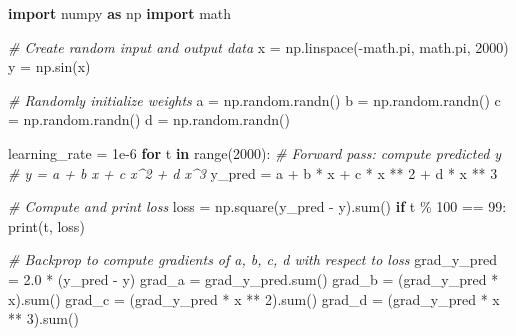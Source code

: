 \documentclass[
]{article}
\newenvironment{Shaded}{}{}
\newcommand{\BuiltInTok}[1]{\textcolor[rgb]{0.00,0.50,0.00}{#1}}
\newcommand{\CommentTok}[1]{\textcolor[rgb]{0.38,0.63,0.69}{\textit{#1}}}
\newcommand{\ControlFlowTok}[1]{\textcolor[rgb]{0.00,0.44,0.13}{\textbf{#1}}}
\newcommand{\DecValTok}[1]{\textcolor[rgb]{0.25,0.63,0.44}{#1}}
\newcommand{\FloatTok}[1]{\textcolor[rgb]{0.25,0.63,0.44}{#1}}
\newcommand{\ImportTok}[1]{\textcolor[rgb]{0.00,0.50,0.00}{\textbf{#1}}}
\newcommand{\KeywordTok}[1]{\textcolor[rgb]{0.00,0.44,0.13}{\textbf{#1}}}
\newcommand{\NormalTok}[1]{#1}
\newcommand{\OperatorTok}[1]{\textcolor[rgb]{0.40,0.40,0.40}{#1}}
\newcommand{\1}{\boldsymbol{1}}
\begin{document}
\begin{Shaded}
\begin{Highlighting}[]
\ImportTok{import}\NormalTok{ numpy }\ImportTok{as}\NormalTok{ np}
\ImportTok{import}\NormalTok{ math}

\CommentTok{\# Create random input and output data}
\NormalTok{x }\OperatorTok{=}\NormalTok{ np.linspace(}\OperatorTok{{-}}\NormalTok{math.pi, math.pi, }\DecValTok{2000}\NormalTok{)}
\NormalTok{y }\OperatorTok{=}\NormalTok{ np.sin(x)}

\CommentTok{\# Randomly initialize weights}
\NormalTok{a }\OperatorTok{=}\NormalTok{ np.random.randn()}
\NormalTok{b }\OperatorTok{=}\NormalTok{ np.random.randn()}
\NormalTok{c }\OperatorTok{=}\NormalTok{ np.random.randn()}
\NormalTok{d }\OperatorTok{=}\NormalTok{ np.random.randn()}

\NormalTok{learning\_rate }\OperatorTok{=} \FloatTok{1e{-}6}
\ControlFlowTok{for}\NormalTok{ t }\KeywordTok{in} \BuiltInTok{range}\NormalTok{(}\DecValTok{2000}\NormalTok{):}
    \CommentTok{\# Forward pass: compute predicted y}
    \CommentTok{\# y = a + b x + c x\^{}2 + d x\^{}3}
\NormalTok{    y\_pred }\OperatorTok{=}\NormalTok{ a }\OperatorTok{+}\NormalTok{ b }\OperatorTok{*}\NormalTok{ x }\OperatorTok{+}\NormalTok{ c }\OperatorTok{*}\NormalTok{ x }\OperatorTok{**} \DecValTok{2} \OperatorTok{+}\NormalTok{ d }\OperatorTok{*}\NormalTok{ x }\OperatorTok{**} \DecValTok{3}

    \CommentTok{\# Compute and print loss}
\NormalTok{    loss }\OperatorTok{=}\NormalTok{ np.square(y\_pred }\OperatorTok{{-}}\NormalTok{ y).}\BuiltInTok{sum}\NormalTok{()}
    \ControlFlowTok{if}\NormalTok{ t }\OperatorTok{\%} \DecValTok{100} \OperatorTok{==} \DecValTok{99}\NormalTok{:}
        \BuiltInTok{print}\NormalTok{(t, loss)}

    \CommentTok{\# Backprop to compute gradients of a, b, c, d with respect to loss}
\NormalTok{    grad\_y\_pred }\OperatorTok{=} \FloatTok{2.0} \OperatorTok{*}\NormalTok{ (y\_pred }\OperatorTok{{-}}\NormalTok{ y)}
\NormalTok{    grad\_a }\OperatorTok{=}\NormalTok{ grad\_y\_pred.}\BuiltInTok{sum}\NormalTok{()}
\NormalTok{    grad\_b }\OperatorTok{=}\NormalTok{ (grad\_y\_pred }\OperatorTok{*}\NormalTok{ x).}\BuiltInTok{sum}\NormalTok{()}
\NormalTok{    grad\_c }\OperatorTok{=}\NormalTok{ (grad\_y\_pred }\OperatorTok{*}\NormalTok{ x }\OperatorTok{**} \DecValTok{2}\NormalTok{).}\BuiltInTok{sum}\NormalTok{()}
\NormalTok{    grad\_d }\OperatorTok{=}\NormalTok{ (grad\_y\_pred }\OperatorTok{*}\NormalTok{ x }\OperatorTok{**} \DecValTok{3}\NormalTok{).}\BuiltInTok{sum}\NormalTok{()}


\end{Highlighting}
\end{Shaded}
\end{document}
